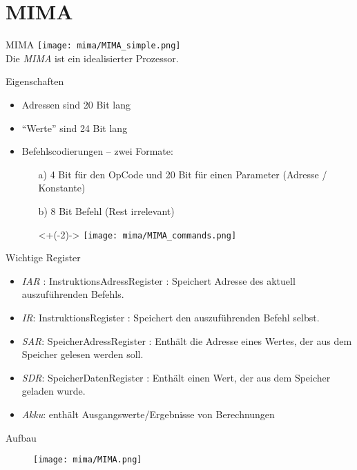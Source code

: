 \section{MIMA}

\begin{frame}{MIMA}
    \centering
	\texttt{[image: mima/MIMA\_simple.png]}\\
	Die \emph{MIMA} ist ein idealisierter Prozessor. 
\end{frame}

\begin{frame}{Eigenschaften}
	\begin{itemize}[<+->]
		\item Adressen sind 20 Bit lang
		\item \enquote{Werte} sind 24 Bit lang
		\item Befehlscodierungen -- zwei Formate:
		\begin{itemize}
			\item[a)] 4 Bit für den OpCode und 20 Bit für einen Parameter (Adresse / Konstante)
			\item[b)] 8 Bit Befehl (Rest irrelevant)\\
			\item[]<+(-2)-> \texttt{[image: mima/MIMA\_commands.png]} 
		\end{itemize} 
	\end{itemize}
\end{frame}


\begin{frame}{Wichtige Register}
	\begin{itemize}[<+->]
		\item \emph{IAR} : InstruktionsAdressRegister : Speichert Adresse des aktuell auszuführenden Befehls.
		\item \emph{IR}: InstruktionsRegister : Speichert den auszuführenden Befehl selbst.
		\item \emph{SAR}: SpeicherAdressRegister : Enthält die Adresse eines Wertes, der aus dem Speicher gelesen werden soll.
		\item \emph{SDR}: SpeicherDatenRegister : Enthält einen Wert, der aus dem Speicher geladen wurde.
		\item \emph{Akku}: enthält Ausgangswerte/Ergebnisse von Berechnungen
	\end{itemize}
\end{frame}

\begin{frame}[t]{Aufbau}
	\begin{figure}
		\centering
		\texttt{[image: mima/MIMA.png]}
	\end{figure}
\end{frame}

